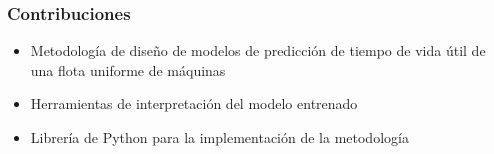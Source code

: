\documentclass{beamer}
\begin{document}
        \begin{frame}
            \frametitle{Contribuciones}
            \begin{itemize}
                \item Metodología de diseño de modelos de predicción de tiempo de vida útil de una flota uniforme de máquinas
                \item Herramientas de interpretación del modelo entrenado
                \item Librería de Python para la implementación de la metodología
            \end{itemize}
        \end{frame}
\end{document}
